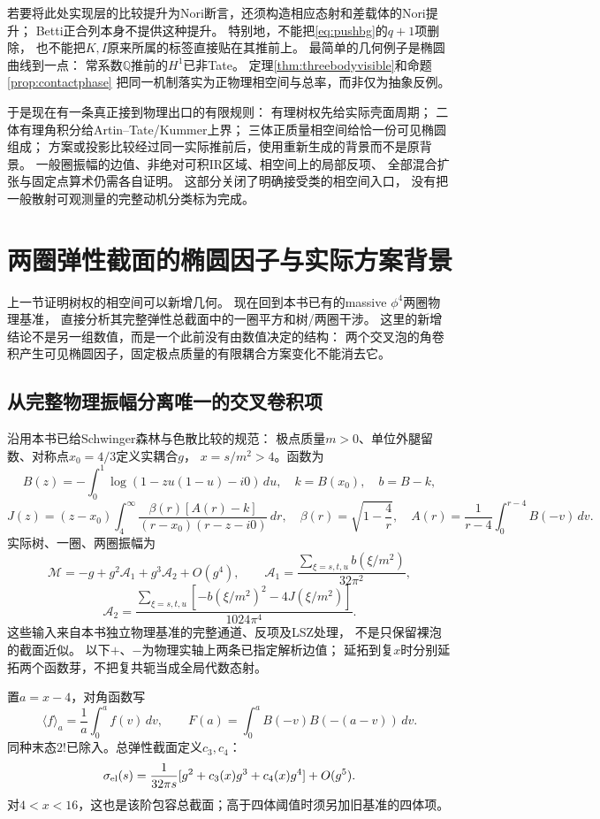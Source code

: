 \documentclass[11pt,a4paper]{ctexart}
\theoremstyle{cnplain}\newtheorem{theorem}{定理}[section]
\theoremstyle{definition}\newtheorem{definition}[theorem]{定义}
\theoremstyle{remark}\newtheorem{remark}[theorem]{注}
\newcommand{\Q}{\mathbb Q}\newcommand{\cC}{\mathcal C}
\begin{document}
若要将此处实现层的比较提升为Nori断言，还须构造相应态射和差载体的Nori提升；
Betti正合列本身不提供这种提升。
特别地，不能把\eqref{eq:pushbg}的$q+1$项删除，
也不能把$K,I$原来所属的标签直接贴在其推前上。
最简单的几何例子是椭圆曲线到一点：
常系数$\Q$推前的$H^1$已非Tate。
定理\ref{thm:threebodyvisible}和命题\ref{prop:contactphase}
把同一机制落实为正物理相空间与总率，而非仅为抽象反例。

于是现在有一条真正接到物理出口的有限规则：
有理树权先给实际壳面周期；
二体有理角积分给Artin--Tate/Kummer上界；
三体正质量相空间给恰一份可见椭圆组成；
方案或投影比较经过同一实际推前后，使用重新生成的背景而不是原背景。
一般圈振幅的边值、非绝对可积IR区域、相空间上的局部反项、
全部混合扩张与固定点算术仍需各自证明。
这部分关闭了明确接受类的相空间入口，
没有把一般散射可观测量的完整动机分类标为完成。



\section{两圈弹性截面的椭圆因子与实际方案背景}\label{sec:elasticelliptic}
上一节证明树权的相空间可以新增几何。
现在回到本书已有的massive $\phi^4$两圈物理基准，
直接分析其完整弹性总截面中的一圈平方和树/两圈干涉。
这里的新增结论不是另一组数值，而是一个此前没有由数值决定的结构：
两个交叉泡的角卷积产生可见椭圆因子，固定极点质量的有限耦合方案变化不能消去它。

\subsection{从完整物理振幅分离唯一的交叉卷积项}
沿用本书已给Schwinger森林与色散比较的规范：
极点质量$m>0$、单位外腿留数、对称点$x_0=4/3$定义实耦合$g$，
$x=s/m^2>4$。函数为
\[
 B(z)=-\int_0^1\log(1-zu(1-u)-i0)\,du,\quad k=B(x_0),\quad b=B-k,
\]
\[
 J(z)=(z-x_0)\int_4^\infty
 \frac{\beta(r)[A(r)-k]}{(r-x_0)(r-z-i0)}\,dr,\quad
 \beta(r)=\sqrt{1-\frac4r},\quad
 A(r)=\frac1{r-4}\int_0^{r-4}B(-v)\,dv .
\]
实际树、一圈、两圈振幅为
\[
 \mathcal M=-g+g^2\mathcal A_1+g^3\mathcal A_2+O(g^4),\qquad
 \mathcal A_1=\frac{\sum_{\xi=s,t,u}b(\xi/m^2)}{32\pi^2},
\]
\[
 \mathcal A_2=\frac{\sum_{\xi=s,t,u}[-b(\xi/m^2)^2-4J(\xi/m^2)]}
                    {1024\pi^4}.
\]
这些输入来自本书独立物理基准的完整通道、反项及LSZ处理，
不是只保留裸泡的截面近似。
以下$+$、$-$为物理实轴上两条已指定解析边值；
延拓到复$x$时分别延拓两个函数芽，不把复共轭当成全局代数态射。

置$a=x-4$，对角函数写
\[
 \langle f\rangle_a=\frac1a\int_0^a f(v)\,dv,\qquad
 F(a)=\int_0^a B(-v)B(-(a-v))\,dv .
\]
同种末态$2!$已除入。总弹性截面定义$c_3,c_4$：
\begin{equation}\label{eq:elasticcoeff}
 \sigma_{\rm el}(s)=\frac1{32\pi s}
       [g^2+c_3(x)g^3+c_4(x)g^4]+O(g^5).
\end{equation}
对$4<x<16$，这也是该阶包容总截面；高于四体阈值时须另加旧基准的四体项。
\end{document}
